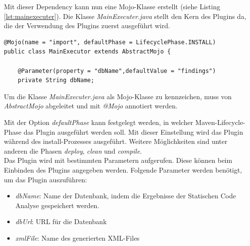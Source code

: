 Mit dieser Dependency kann nun eine Mojo-Klasse erstellt (siehe Listing  \ref{lst:mainexecuter}). Die Klasse \textit{MainExecuter.java} stellt den Kern des Plugins da, die der Verwendung des Plugins zuerst ausgeführt wird.  \cite{gonzalezMavenTutorial}

\lstset{
  caption={Kopf der Executor-Klasse: Sie wird mit dem Aufruf des Plugins zuerst gestartet.}, 
  basicstyle=\small\ttfamily, 
  label=lst:mainexecuter, 
  language=Java,
  frame=single,
  breaklines=true, %
  postbreak=\mbox{\textcolor{red}{$\hookrightarrow$}\space},
}

\begin{samepage}%
	\begin{lstlisting}[float=tbhp]
@Mojo(name = "import", defaultPhase = LifecyclePhase.INSTALL)
public class MainExecutor extends AbstractMojo {

    @Parameter(property = "dbName",defaultValue = "findings")
    private String dbName;
	\end{lstlisting}
\end{samepage}
	

Um die Klasse \textit{MainExecuter.java} als Mojo-Klasse zu kennzeichen, muss von \textit{AbstractMojo} abgeleitet und mit \textit{@Mojo} annotiert werden.


Mit der Option \textit{defaultPhase} kann festgelegt werden, in welcher Maven-Lifecycle-Phase das Plugin ausgeführt werden soll. Mit dieser Einstellung wird das Plugin während des install-Prozesses ausgeführt. Weitere Möglichkeiten sind unter anderen die Phasen  \textit{deploy},  \textit{clean} und  \textit{compile}. \\

Das Plugin wird mit bestimmten Parametern aufgerufen. Diese können beim Einbinden des Plugins angegeben werden. Folgende Parameter werden benötigt, um das Plugin auszuführen:

\begin{itemize}
\item \textit{dbName}: Name der Datenbank, indem die Ergebnisse der Statischen Code Analyse gespeichert werden. 
\item \textit{dbUrl}: URL für die Datenbank
\item \textit{xmlFile}: Name des generierten XML-Files
\end{itemize}
  
